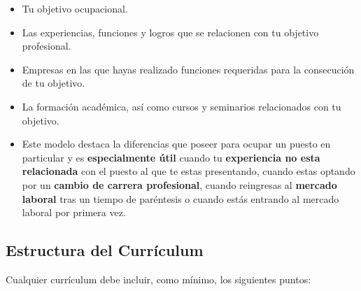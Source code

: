 \begin{itemize}
    \begin{itemize}
        \item Tu objetivo ocupacional.
        \item Las experiencias, funciones y logros que se relacionen con tu objetivo profesional.
        \item Empresas en las que hayas realizado funciones requeridas para la consecución de tu objetivo.
        \item La formación académica, así como cursos y seminarios relacionados con tu objetivo.
        \item Este modelo destaca la diferencias que poseer para ocupar un puesto en particular y es \textbf{especialmente útil} cuando tu \textbf{experiencia no esta relacionada} con el puesto al que te estas presentando, cuando estas optando por un \textbf{cambio de carrera profesional}, cuando reingresas al \textbf{mercado laboral} tras un tiempo de paréntesis o cuando estás entrando al mercado laboral por primera vez.
    \end{itemize}
\end{itemize}

\subsection{Estructura del Currículum}
Cualquier currículum debe incluir, como mínimo, los siguientes puntos:

